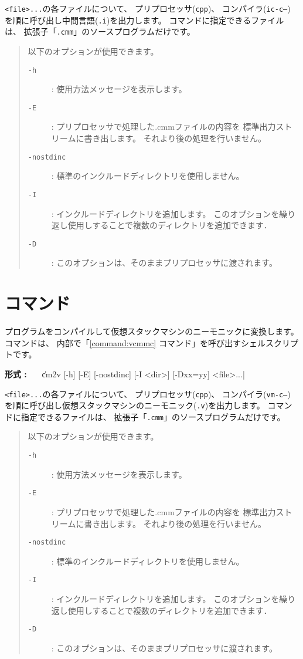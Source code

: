 {\tt <file>...}の各ファイルについて、
プリプロセッサ({\tt cpp})、
コンパイラ({\tt ic-c--})
を順に呼び出し中間言語({\tt .i})を出力します。
{\cmi}コマンドに指定できるファイルは、
拡張子「{\tt .cmm}」の{\cmml}ソースプログラムだけです。

\begin{quote}
\hspace{-1em}以下のオプションが使用できます。

\begin{description}
\item[{\tt -h}] : 使用方法メッセージを表示します。
\item[{\tt -E}] : プリプロセッサで処理した{.cmm}ファイルの内容を
標準出力ストリームに書き出します。
それより後の処理を行いません。
\item[{\tt -nostdinc}] : 標準のインクルードディレクトリを使用しません。
\item[{\tt -I}] : インクルードディレクトリを追加します。
このオプションを繰り返し使用しすることで複数のディレクトリを追加できます．
\item[{\tt -D}] : このオプションは、そのままプリプロセッサに渡されます。
\end{description}
\end{quote}

\section{{\cmv}コマンド}

{\cmm}プログラムをコンパイルして仮想スタックマシンのニーモニックに変換します。
{\cmv}コマンドは、
内部で「\ref{command:vcmmc} {\vcmmc}コマンド」を呼び出すシェルスクリプトです。

\begin{flushleft}
{\bf 形式 : }~~~\|cm2v [-h] [-E] [-nostdinc] [-I <dir>] [-Dxx=yy] <file>...|
\end{flushleft}

{\tt <file>...}の各ファイルについて、
プリプロセッサ({\tt cpp})、
コンパイラ({\tt vm-c--})
を順に呼び出し仮想スタックマシンのニーモニック({\tt .v})を出力します。
{\cmv}コマンドに指定できるファイルは、
拡張子「{\tt .cmm}」の{\cmml}ソースプログラムだけです。

\begin{quote}
\hspace{-1em}以下のオプションが使用できます。

\begin{description}
\item[{\tt -h}] : 使用方法メッセージを表示します。
\item[{\tt -E}] : プリプロセッサで処理した{.cmm}ファイルの内容を
標準出力ストリームに書き出します。
それより後の処理を行いません。
\item[{\tt -nostdinc}] : 標準のインクルードディレクトリを使用しません。
\item[{\tt -I}] : インクルードディレクトリを追加します。
このオプションを繰り返し使用しすることで複数のディレクトリを追加できます．
\item[{\tt -D}] : このオプションは、そのままプリプロセッサに渡されます。
\end{description}
\end{quote}

